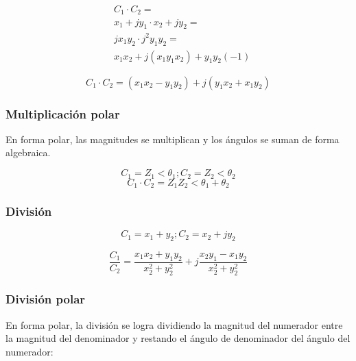 \begin{align*}
	 & C_{1}\cdot C_{2}=                                                  \\
	 & x_{1}+jy_{1}\cdot x_{2}+jy_{2}=                                    \\
	 & jx_{1}y_{2} \cdot j^2y_{1}y_{2}=                                   \\
	 & x_{1}x_{2}+j\left(x_{1}y_{1}x_{2}\right)+y_{1}y_{2}\left(-1\right)
\end{align*}

\begin{equation}
	C_{1}\cdot C_{2}=\left(x_{1}x_{2}-y_{1}y_{2}\right)+j\left(y_{1}x_{2}+x_{1}y_{2}\right)
\end{equation}

\subsubsection{Multiplicación polar}

En forma polar, las magnitudes se multiplican y los ángulos se suman de forma algebraica.

\begin{equation*}
	C_{1}=Z_{1}<\theta_{1}; C_{2}=Z_{2}<\theta_{2}
\end{equation*}
\begin{equation}
	C_{1}\cdot C_{2}=Z_{1}Z_{2}<\theta_{1}+\theta_{2}
\end{equation}

\subsubsection{División}
\begin{equation*}
	C_{1}=x_{1}+y_{2}; C_{2}=x_{2}+jy_{2}
\end{equation*}

\begin{equation}
	\frac{C_1}{C_2}=\frac{x_{1}x_{2}+y_{1}y_{2}}{x_{2}^2+y_{2}^2}+j \frac{x_{2}y_{1}-x_{1}y_{2}}{x_{2}^2+y_{2}^2}
\end{equation}

\subsubsection{División polar}

En forma polar, la división se logra dividiendo la magnitud del numerador entre la magnitud del denominador y restando el ángulo de denominador del ángulo del numerador:

